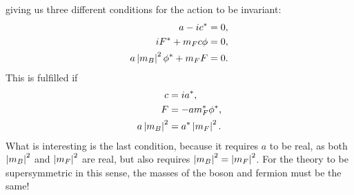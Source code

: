 \documentclass[../main.tex]{subfiles}
\begin{document}
            giving us three different conditions for the action to be invariant:
            \begin{subequations}
                \begin{align}
                    a - ic^\ast                    & = 0, \\
                    i F^\ast + m_F c \phi          & = 0, \\
                    a\left|m_B\right|^2 \phi^\ast + m_F F & = 0.
                \end{align}
            \end{subequations}
            This is fulfilled if
            \begin{subequations}
                \begin{align}
                    c            & = i a^\ast,              \\
                    F            & = -a m_F^\ast \phi^\ast, \\
                    a\left|m_B\right|^2 & = a^\ast \left|m_F\right|^2.
                \end{align}
            \end{subequations}
            What is interesting is the last condition, because it requires \(a\) to be real, as both \(\left|m_B\right|^2\) and \(\left|m_F\right|^2\) are real, but also requires \(\left|m_B\right|^2 = \left|m_F\right|^2\).
            For the theory to be supersymmetric in this sense, the masses of the boson and fermion must be the same!
\end{document}
